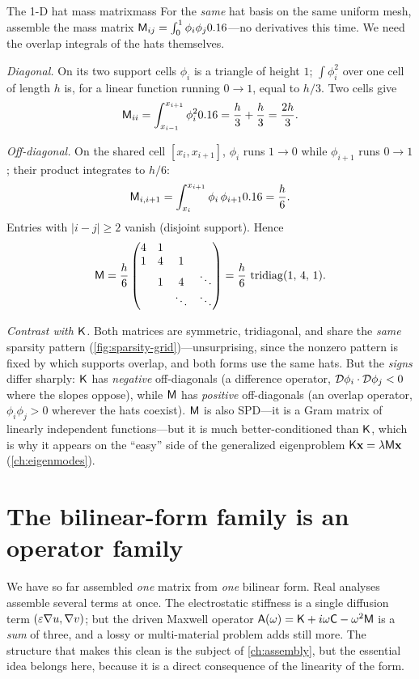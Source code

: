 \begin{workedexample}{The 1-D hat mass matrix}{mass}
\label{wex:mass}
For the \emph{same} hat basis on the same uniform mesh, assemble the mass matrix
$\mathsf{M}_{ij}=\int_0^1\phi_i\phi_j0.16$---no derivatives this time. We need the
overlap integrals of the hats themselves.

\emph{Diagonal.} On its two support cells $\phi_i$ is a triangle of height $1$;
$\int\phi_i^2$ over one cell of length $h$ is, for a linear function running
$0\to1$, equal to $h/3$. Two cells give
\[
\mathsf{M}_{ii}=\int_{x_{i-1}}^{x_{i+1}}\phi_i^20.16=\frac h3+\frac h3=\frac{2h}{3}.
\]

\emph{Off-diagonal.} On the shared cell $[x_i,x_{i+1}]$, $\phi_i$ runs $1\to0$
while $\phi_{i+1}$ runs $0\to1$; their product integrates to $h/6$:
\[
\mathsf{M}_{i,i+1}=\int_{x_i}^{x_{i+1}}\phi_i\,\phi_{i+1}0.16=\frac h6.
\]
Entries with $|i-j|\ge2$ vanish (disjoint support). Hence
\[
\mathsf{M}=\frac h6
\begin{pmatrix}
4 & 1 & & \\
1 & 4 & 1 & \\
 & 1 & 4 & \ddots\\
 & & \ddots & \ddots
\end{pmatrix}
=\frac h6\,\operatorname{tridiag}(1,\,4,\,1).
\]

\emph{Contrast with $\mathsf{K}$.} Both matrices are symmetric, tridiagonal, and
share the \emph{same} sparsity pattern (\cref{fig:sparsity-grid})---unsurprising,
since the nonzero pattern is fixed by which supports overlap, and both forms use
the same hats. But the \emph{signs} differ sharply: $\mathsf{K}$ has \emph{negative}
off-diagonals (a difference operator, $\mathcal{D}\phi_i\cdot\mathcal{D}\phi_j<0$ where
the slopes oppose), while $\mathsf{M}$ has \emph{positive} off-diagonals (an overlap
operator, $\phi_i\phi_j>0$ wherever the hats coexist). $\mathsf{M}$ is also SPD---it
is a Gram matrix of linearly independent functions---but it is much
better-conditioned than $\mathsf{K}$, which is why it appears on the ``easy'' side of
the generalized eigenproblem $\mathsf{K}\mathbf{x}=\lambda\mathsf{M}\mathbf{x}$
(\cref{ch:eigenmodes}).
\end{workedexample}

\section{The bilinear-form family is an operator family}
\label{sec:family}

We have so far assembled \emph{one} matrix from \emph{one} bilinear form. Real
analyses assemble several terms at once. The electrostatic stiffness is a single
diffusion term $(\varepsilon\nabla u,\nabla v)$; but the driven Maxwell operator
$\mathsf{A}(\omega)=\mathsf{K}+i\omega\mathsf{C}-\omega^2\mathsf{M}$ is a \emph{sum} of three,
and a lossy or multi-material problem adds still more. The structure that makes
this clean is the subject of \cref{ch:assembly}, but the essential idea belongs
here, because it is a direct consequence of the linearity of the form.

